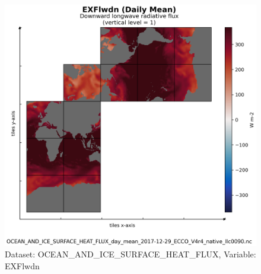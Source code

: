 \begin{figure}[H]
\centering
\includegraphics[scale=0.55]{../images/plots/v4r4/native_plots/Ocean_and_Sea-Ice_Surface_Heat_Fluxes/EXFlwdn.png}
\caption{Dataset: OCEAN\_AND\_ICE\_SURFACE\_HEAT\_FLUX, Variable: EXFlwdn}
\label{tab:table-OCEAN_AND_ICE_SURFACE_HEAT_FLUX_EXFlwdn-Plot}
\end{figure}
\newpage
\pagebreak
